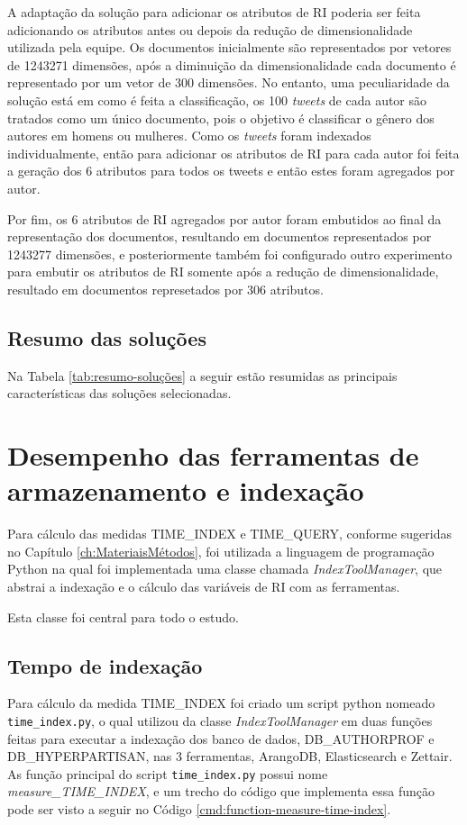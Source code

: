 				A adaptação da solução para adicionar os atributos de RI poderia ser feita adicionando os atributos antes ou depois da redução de dimensionalidade utilizada pela equipe.
				Os documentos inicialmente são representados por vetores de 1243271 dimensões, após a diminuição da dimensionalidade cada documento é representado por um vetor de 300 dimensões.
				No entanto, uma peculiaridade da solução está em como é feita a classificação, os 100 \textit{tweets} de cada autor são tratados como um único documento, pois o objetivo é classificar o gênero dos autores em homens ou mulheres.
				Como os \textit{tweets} foram indexados individualmente, então para adicionar os atributos de RI para cada autor foi feita a geração dos 6 atributos para todos os tweets e então estes foram agregados por autor.


				Por fim, os 6 atributos de RI agregados por autor foram embutidos ao final da representação dos documentos, resultando em documentos representados por 1243277 dimensões, e posteriormente também foi configurado outro experimento para embutir os atributos de RI somente após a redução de dimensionalidade, resultado em documentos represetados por 306 atributos.


		\subsection{Resumo das soluções} \label{sec:ResumoDasSoluções}
			Na Tabela \ref{tab:resumo-soluções} a seguir estão resumidas as principais características das soluções selecionadas.

			

	\section{Desempenho das ferramentas de armazenamento e indexação} \label{sec:DesempenhoFerramentas}
		Para cálculo das medidas TIME\_INDEX e TIME\_QUERY, conforme sugeridas no Capítulo \ref{ch:MateriaisMétodos}, foi utilizada a linguagem de programação Python na qual foi implementada uma classe chamada \textit{IndexToolManager}, que abstrai a indexação e o cálculo das variáveis de RI com as ferramentas. 

		Esta classe foi central para todo o estudo.
		\subsection{Tempo de indexação}
			Para cálculo da medida TIME\_INDEX foi criado um script python nomeado \texttt{time\_index.py}, o qual utilizou da classe \textit{IndexToolManager} em duas funções feitas para executar a indexação dos banco de dados, DB\_AUTHORPROF e DB\_HYPERPARTISAN, nas 3 ferramentas, ArangoDB, Elasticsearch e Zettair.
			As função principal do script \texttt{time\_index.py} possui nome \textit{measure\_TIME\_INDEX}, e um trecho do código que implementa essa função pode ser visto a seguir no Código \ref{cmd:function-measure-time-index}.

